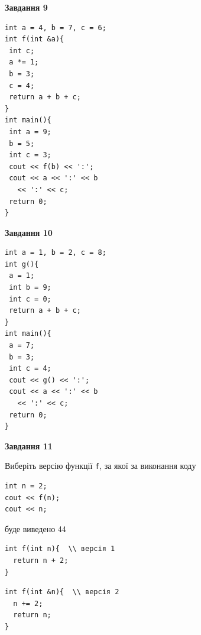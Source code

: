 \documentclass[12pt, ukrainian]{article}
\def\code#1{\Verb!#1!}
\begin{document}
{\begin {large}
\begin{minipage}[t]{11.0cm}
\end{minipage}


\begin{minipage}[t]{7.0cm}

\begin{center}
\textbf{Завдання 9}
\end{center}
\vspace{-8mm}

\begin{verbatim}
int a = 4, b = 7, c = 6;
int f(int &a){
 int c;
 a *= 1;
 b = 3;
 c = 4;
 return a + b + c;
}
int main(){
 int a = 9;
 b = 5;
 int c = 3;
 cout << f(b) << ':';
 cout << a << ':' << b 
   << ':' << c;
 return 0;
}
\end{verbatim}



\begin{center}
\textbf{Завдання 10}
\end{center}
\vspace{-8mm}

\begin{verbatim}
int a = 1, b = 2, c = 8;
int g(){
 a = 1;
 int b = 9;
 int c = 0;
 return a + b + c;
}
int main(){
 a = 7;
 b = 3;
 int c = 4;
 cout << g() << ':';
 cout << a << ':' << b 
   << ':' << c;
 return 0;
}
\end{verbatim}

\end{minipage}
\vline \hspace{1mm}
\begin{minipage}[t]{11.0cm}

\begin{center}
\textbf{Завдання 11}
\end{center}
Виберіть версію функції \code{f}, за якої за виконання коду
\begin{verbatim}
int n = 2;
cout << f(n);
cout << n;
\end{verbatim}

буде виведено 44

\begin{verbatim}
int f(int n){  \\ версія 1
  return n + 2;
}
\end{verbatim}

\vspace{-8mm}\begin{verbatim}
int f(int &n){  \\ версія 2
  n += 2;
  return n;
}
\end{verbatim}


\end{minipage}
\end{large}}
\end{document}

